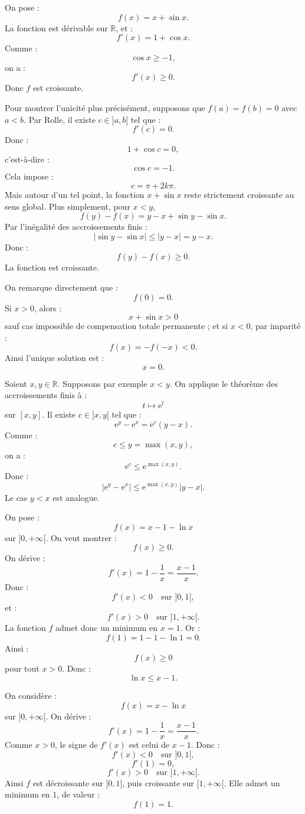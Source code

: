 \documentclass[11pt,a4paper]{article}
\newcommand{\R}{\mathbb R}
\newcommand{\e}{\mathrm e}
\begin{document}
\begin{correctionbox}[7]
On pose :
\[
f(x)=x+\sin x.
\]
La fonction est dérivable sur \(\R\), et :
\[
f'(x)=1+\cos x.
\]
Comme :
\[
\cos x\geq -1,
\]
on a :
\[
f'(x)\geq0.
\]
Donc \(f\) est croissante.

Pour montrer l'unicité plus précisément, supposons que \(f(a)=f(b)=0\) avec \(a<b\).  
Par Rolle, il existe \(c\in]a,b[\) tel que :
\[
f'(c)=0.
\]
Donc :
\[
1+\cos c=0,
\]
c'est-à-dire :
\[
\cos c=-1.
\]
Cela impose :
\[
c=\pi+2k\pi.
\]
Mais autour d'un tel point, la fonction \(x+\sin x\) reste strictement croissante au sens global.  
Plus simplement, pour \(x<y\),
\[
f(y)-f(x)=y-x+\sin y-\sin x.
\]
Par l'inégalité des accroissements finis :
\[
|\sin y-\sin x|\leq |y-x|=y-x.
\]
Donc :
\[
f(y)-f(x)\geq0.
\]
La fonction est croissante.

On remarque directement que :
\[
f(0)=0.
\]
Si \(x>0\), alors :
\[
x+\sin x>0
\]
sauf cas impossible de compensation totale permanente ; et si \(x<0\), par imparité :
\[
f(x)=-f(-x)<0.
\]
Ainsi l'unique solution est :
\[
x=0.
\]
\end{correctionbox}

\begin{correctionbox}[8]
Soient \(x,y\in\R\).  
Supposons par exemple \(x<y\).  
On applique le théorème des accroissements finis à :
\[
t\mapsto \e^t
\]
sur \([x,y]\).  
Il existe \(c\in]x,y[\) tel que :
\[
\e^y-\e^x=\e^c(y-x).
\]
Comme :
\[
c\leq y=\max(x,y),
\]
on a :
\[
\e^c\leq \e^{\max(x,y)}.
\]
Donc :
\[
|\e^y-\e^x|\leq \e^{\max(x,y)}|y-x|.
\]
Le cas \(y<x\) est analogue.
\end{correctionbox}

\begin{correctionbox}[9]
On pose :
\[
f(x)=x-1-\ln x
\]
sur \(]0,+\infty[\).  
On veut montrer :
\[
f(x)\geq0.
\]
On dérive :
\[
f'(x)=1-\frac1x=\frac{x-1}{x}.
\]
Donc :
\[
f'(x)<0
\quad\text{sur } ]0,1[,
\]
et :
\[
f'(x)>0
\quad\text{sur } ]1,+\infty[.
\]
La fonction \(f\) admet donc un minimum en \(x=1\).  
Or :
\[
f(1)=1-1-\ln1=0.
\]
Ainsi :
\[
f(x)\geq0
\]
pour tout \(x>0\).  
Donc :
\[
\ln x\leq x-1.
\]
\end{correctionbox}

\begin{correctionbox}[10]
On considère :
\[
f(x)=x-\ln x
\]
sur \(]0,+\infty[\).  
On dérive :
\[
f'(x)=1-\frac1x=\frac{x-1}{x}.
\]
Comme \(x>0\), le signe de \(f'(x)\) est celui de \(x-1\).  
Donc :
\[
f'(x)<0\quad\text{sur } ]0,1[,
\]
\[
f'(1)=0,
\]
\[
f'(x)>0\quad\text{sur } ]1,+\infty[.
\]
Ainsi \(f\) est décroissante sur \(]0,1]\), puis croissante sur \([1,+\infty[\).  
Elle admet un minimum en \(1\), de valeur :
\[
f(1)=1.
\]
\end{correctionbox}
\end{document}
